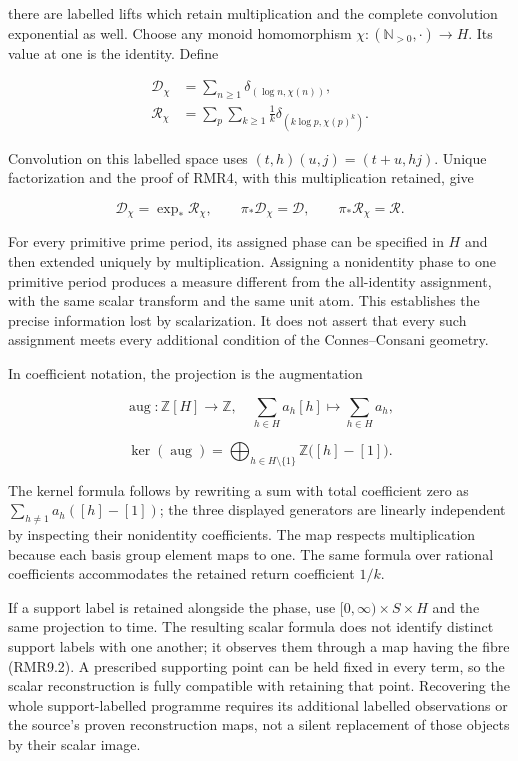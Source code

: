 \documentclass[
]{article}
\begin{document}
there are labelled lifts which retain multiplication and the complete
convolution exponential as well. Choose any monoid homomorphism
\(\chi:(\mathbb N_{>0},\cdot)\to H\). Its value at one is the identity.
Define

\[
\begin{aligned}
\mathcal D_\chi&=\sum_{n\ge1}\delta_{(\log n,\chi(n))},\\
\mathcal R_\chi&=\sum_p\sum_{k\ge1}\frac1k
\delta_{(k\log p,\chi(p)^k)}.
\end{aligned}
\tag{RMR9.3}
\]

Convolution on this labelled space uses \((t,h)(u,j)=(t+u,hj)\). Unique
factorization and the proof of RMR4, with this multiplication retained,
give

\[
\mathcal D_\chi=\exp_*\mathcal R_\chi,
\qquad
\pi_*\mathcal D_\chi=\mathcal D,
\qquad
\pi_*\mathcal R_\chi=\mathcal R.
\tag{RMR9.4}
\]

For every primitive prime period, its assigned phase can be specified in
\(H\) and then extended uniquely by multiplication. Assigning a
nonidentity phase to one primitive period produces a measure different
from the all-identity assignment, with the same scalar transform and the
same unit atom. This establishes the precise information lost by
scalarization. It does not assert that every such assignment meets every
additional condition of the Connes--Consani geometry.

In coefficient notation, the projection is the augmentation

\[
\operatorname{aug}:\mathbb Z[H]\longrightarrow\mathbb Z,
\quad\sum_{h\in H}a_h[h]\longmapsto\sum_{h\in H}a_h,
\]

\[
\ker(\operatorname{aug})
=\bigoplus_{h\in H\setminus\{1\}}\mathbb Z\bigl([h]-[1]\bigr).
\tag{RMR9.5}
\]

The kernel formula follows by rewriting a sum with total coefficient
zero as \(\sum_{h\ne1}a_h([h]-[1])\); the three displayed generators are
linearly independent by inspecting their nonidentity coefficients. The
map respects multiplication because each basis group element maps to
one. The same formula over rational coefficients accommodates the
retained return coefficient \(1/k\).

If a support label is retained alongside the phase, use
\([0,\infty)\times S\times H\) and the same projection to time. The
resulting scalar formula does not identify distinct support labels with
one another; it observes them through a map having the fibre (RMR9.2). A
prescribed supporting point can be held fixed in every term, so the
scalar reconstruction is fully compatible with retaining that point.
Recovering the whole support-labelled programme requires its additional
labelled observations or the source's proven reconstruction maps, not a
silent replacement of those objects by their scalar image.
\end{document}
